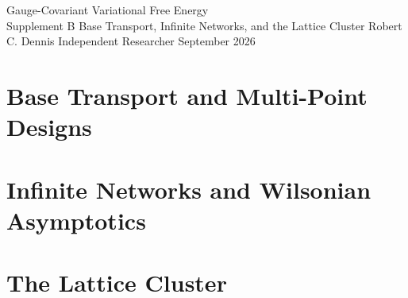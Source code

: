 \documentclass[11pt,letterpaper]{report}
\renewcommand{\thechapter}{B\arabic{chapter}}
\begin{document}
\hypersetup{pageanchor=false}
\makereporttitle
  {Gauge-Covariant Variational Free Energy\\Supplement B}
  {Base Transport, Infinite Networks, and the Lattice Cluster}
  {Robert C. Dennis}
  {Independent Researcher}
  {September 2026}

\hypersetup{pageanchor=true}
\tableofcontents
\listoftables
\clearpage
{}

\part{Base Transport and Multi-Point Designs}
\setcounter{chapter}{-1}






\part{Infinite Networks and Wilsonian Asymptotics}



\part{The Lattice Cluster}




\appendix
{}
\renewcommand{\thechapter}{B\Alph{chapter}}







\end{document}
